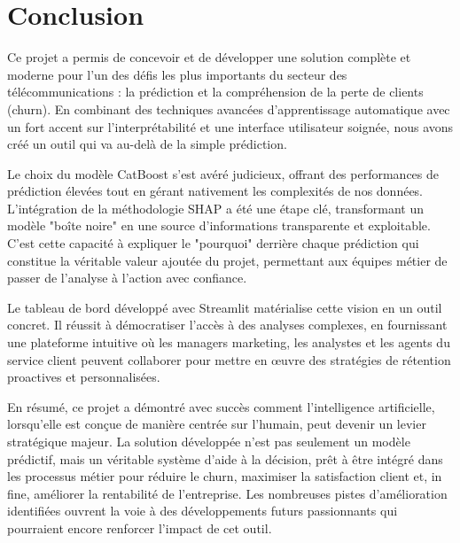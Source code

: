 \chapter{Conclusion}
\label{chap:conclusion}

Ce projet a permis de concevoir et de développer une solution complète et moderne pour l'un des défis les plus importants du secteur des télécommunications : la prédiction et la compréhension de la perte de clients (churn). En combinant des techniques avancées d'apprentissage automatique avec un fort accent sur l'interprétabilité et une interface utilisateur soignée, nous avons créé un outil qui va au-delà de la simple prédiction.

Le choix du modèle CatBoost s'est avéré judicieux, offrant des performances de prédiction élevées tout en gérant nativement les complexités de nos données. L'intégration de la méthodologie SHAP a été une étape clé, transformant un modèle "boîte noire" en une source d'informations transparente et exploitable. C'est cette capacité à expliquer le "pourquoi" derrière chaque prédiction qui constitue la véritable valeur ajoutée du projet, permettant aux équipes métier de passer de l'analyse à l'action avec confiance.

Le tableau de bord développé avec Streamlit matérialise cette vision en un outil concret. Il réussit à démocratiser l'accès à des analyses complexes, en fournissant une plateforme intuitive où les managers marketing, les analystes et les agents du service client peuvent collaborer pour mettre en œuvre des stratégies de rétention proactives et personnalisées.

En résumé, ce projet a démontré avec succès comment l'intelligence artificielle, lorsqu'elle est conçue de manière centrée sur l'humain, peut devenir un levier stratégique majeur. La solution développée n'est pas seulement un modèle prédictif, mais un véritable système d'aide à la décision, prêt à être intégré dans les processus métier pour réduire le churn, maximiser la satisfaction client et, in fine, améliorer la rentabilité de l'entreprise. Les nombreuses pistes d'amélioration identifiées ouvrent la voie à des développements futurs passionnants qui pourraient encore renforcer l'impact de cet outil.
